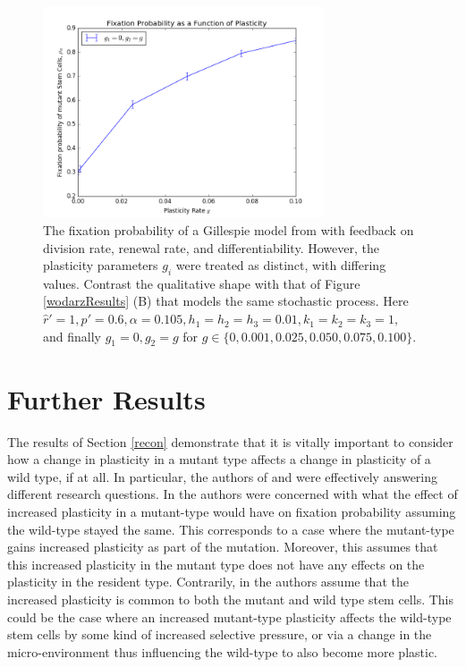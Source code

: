 \documentclass[12pt]{article}
\begin{document}
\begin{figure}[!ht]
\begin{center}
\includegraphics[width=0.74\textwidth]{gill_fix.png}
\end{center}
\caption{The fixation probability of a Gillespie model from \cite{wodarz} with feedback on division rate, renewal rate, and differentiability. However, the plasticity parameters $g_i$ were treated as distinct, with differing values. Contrast the qualitative shape with that of Figure \ref{wodarzResults} (B) that models the same stochastic process. Here $\hat{r}'=1, p'=0.6, \alpha=0.105, h_1=h_2=h_3=0.01, k_1=k_2=k_3=1,$ and finally $g_1=0, g_2=g$ for $g\in\{0,0.001,0.025,0.050,0.075,0.100\}$.}\label{GillFix}
\end{figure}

\section{Further Results}
The results of Section \ref{recon} demonstrate that it is vitally important to consider how a change in plasticity in a mutant type affects a change in plasticity of a wild type, if at all.
In particular, the authors of \cite{mohammad} and \cite{wodarz} were effectively answering different research questions. In \cite{mohammad} the authors were concerned with what the effect of increased plasticity in a mutant-type would have on fixation probability assuming the wild-type stayed the same. This corresponds to a case where the mutant-type gains increased plasticity as part of the mutation. Moreover, this assumes that this increased plasticity in the mutant type does not have any effects on the plasticity in the resident type. Contrarily, in \cite{wodarz} the authors assume that the increased plasticity is common to both the mutant and wild type stem cells. This could be the case where an increased mutant-type plasticity affects the wild-type stem cells by some kind of increased selective pressure, or via a change in the micro-environment thus influencing the wild-type to also become more plastic.
\end{document}
